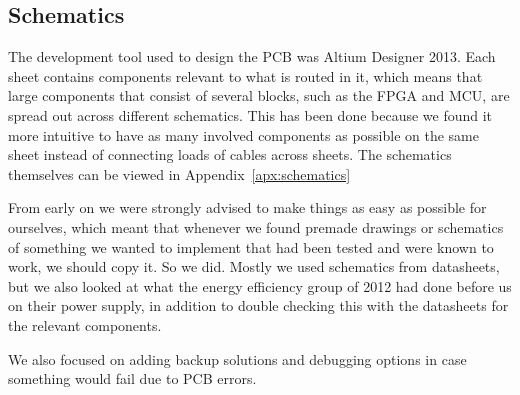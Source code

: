 
\subsection{Schematics}

The development tool used to design the PCB was Altium Designer 2013. Each sheet
contains components relevant to what is routed in it, which means that large
components that consist of several blocks, such as the FPGA and MCU, are spread
out across different schematics. This has been done because we found it more
intuitive to have as many involved components as possible on the same sheet
instead of connecting loads of cables across sheets. The schematics themselves
can be viewed in Appendix~\ref{apx:schematics} 

From early on we were strongly advised to make things as easy as possible for
ourselves, which meant that whenever we found premade drawings or schematics of
something we wanted to implement that had been tested and were known to work, we
should copy it. So we did. Mostly we used schematics from datasheets, but we
also looked at what the energy efficiency group of 2012 had done before us on
their power supply, in addition to double checking this with the datasheets for
the relevant components.

We also focused on adding backup solutions and debugging options in case
something would fail due to PCB errors.

